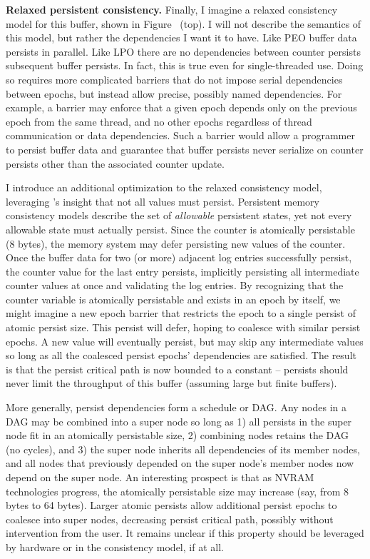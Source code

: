 \textbf{Relaxed persistent consistency.}
Finally, I imagine a relaxed consistency model for this buffer, shown in Figure~ (top).
I will not describe the semantics of this model, but rather the dependencies I want it to have.
Like PEO buffer data persists in parallel.
Like LPO there are no dependencies between counter persists subsequent buffer persists.
In fact, this is true even for single-threaded use.
Doing so requires more complicated barriers that do not impose serial dependencies between epochs, but instead allow precise, possibly named dependencies.
For example, a barrier may enforce that a given epoch depends only on the previous epoch from the same thread, and no other epochs regardless of thread communication or data dependencies.
Such a barrier would allow a programmer to persist buffer data and guarantee that buffer persists never serialize on counter persists other than the associated counter update.

I introduce an additional optimization to the relaxed consistency model, leveraging 's insight that not all values must persist.
Persistent memory consistency models describe the set of \emph{allowable} persistent states, yet not every allowable state must actually persist.
Since the counter is atomically persistable (8 bytes), the memory system may defer persisting new values of the counter.
Once the buffer data for two (or more) adjacent log entries successfully persist, the counter value for the last entry persists, implicitly persisting all intermediate counter values at once and validating the log entries.
By recognizing that the counter variable is atomically persistable and exists in an epoch by itself, we might imagine a new epoch barrier that restricts the epoch to a single persist of atomic persist size.
This persist will defer, hoping to coalesce with similar persist epochs.
A new value will eventually persist, but may skip any intermediate values so long as all the coalesced persist epochs' dependencies are satisfied.
The result is that the persist critical path is now bounded to a constant -- persists should never limit the throughput of this buffer (assuming large but finite buffers).

More generally, persist dependencies form a schedule or DAG.
Any nodes in a DAG may be combined into a super node so long as 1) all persists in the super node fit in an atomically persistable size, 2) combining nodes retains the DAG (no cycles), and 3) the super node inherits all dependencies of its member nodes, and all nodes that previously depended on the super node's member nodes now depend on the super node.
An interesting prospect is that as NVRAM technologies progress, the atomically persistable size may increase (say, from 8 bytes to 64 bytes).
Larger atomic persists allow additional persist epochs to coalesce into super nodes, decreasing persist critical path, possibly without intervention from the user.
It remains unclear if this property should be leveraged by hardware or in the consistency model, if at all.

